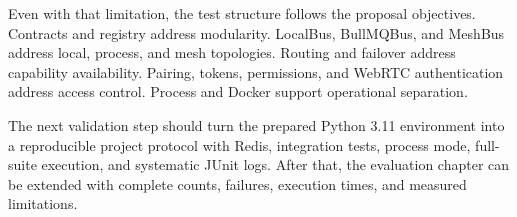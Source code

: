 Even with that limitation, the test structure follows the proposal objectives. Contracts and registry address modularity. LocalBus, BullMQBus, and MeshBus address local, process, and mesh topologies. Routing and failover address capability availability. Pairing, tokens, permissions, and WebRTC authentication address access control. Process and Docker support operational separation.

The next validation step should turn the prepared Python 3.11 environment into a reproducible project protocol with Redis, integration tests, process mode, full-suite execution, and systematic JUnit logs. After that, the evaluation chapter can be extended with complete counts, failures, execution times, and measured limitations.
